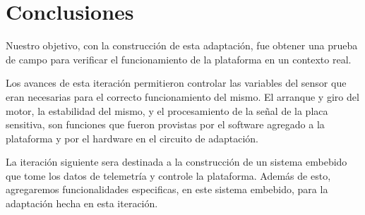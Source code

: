 

\section{Conclusiones} %
\label{it6:sec:conclusiones}

Nuestro objetivo, con la construcción de esta adaptación, fue obtener una prueba de campo para verificar el funcionamiento de la plataforma en un contexto real.

Los avances de esta iteración permitieron controlar las variables del sensor que eran necesarias para el correcto funcionamiento del mismo. El arranque y giro del motor, la estabilidad del mismo, y el procesamiento de la señal de la placa sensitiva, son funciones que fueron provistas por el software agregado a la plataforma y por el hardware en el circuito de adaptación. 

La iteración siguiente sera destinada a la construcción de un sistema embebido que tome los datos de telemetría y controle la plataforma. Además de esto, agregaremos funcionalidades especificas, en este sistema embebido, para la adaptación hecha en esta iteración. 


